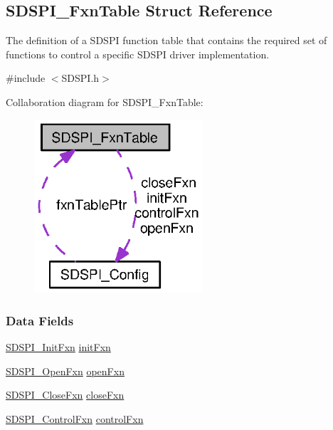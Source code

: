 \subsection{S\-D\-S\-P\-I\-\_\-\-Fxn\-Table Struct Reference}
\label{struct_s_d_s_p_i___fxn_table}


The definition of a S\-D\-S\-P\-I function table that contains the required set of functions to control a specific S\-D\-S\-P\-I driver implementation.  




{\ttfamily \#include $<$S\-D\-S\-P\-I.\-h$>$}



Collaboration diagram for S\-D\-S\-P\-I\-\_\-\-Fxn\-Table\-:
\nopagebreak
\begin{figure}[H]
\begin{center}
\leavevmode
\includegraphics[width=177pt]{struct_s_d_s_p_i___fxn_table__coll__graph}
\end{center}
\end{figure}
\subsubsection*{Data Fields}
\begin{DoxyCompactItemize}
\item 
\hyperlink{_s_d_s_p_i_8h_a3171d9675e245720a8552f667e33ba54}{S\-D\-S\-P\-I\-\_\-\-Init\-Fxn} \hyperlink{struct_s_d_s_p_i___fxn_table_ac593f7347a7b145179fec8e4160816d2}{init\-Fxn}
\item 
\hyperlink{_s_d_s_p_i_8h_a2ff79d0b69515e8da6ad65367239236b}{S\-D\-S\-P\-I\-\_\-\-Open\-Fxn} \hyperlink{struct_s_d_s_p_i___fxn_table_a822c1861740700d5cc489d063552e9e3}{open\-Fxn}
\item 
\hyperlink{_s_d_s_p_i_8h_a81531f5ec9d2e1b167e3c21edc1636cb}{S\-D\-S\-P\-I\-\_\-\-Close\-Fxn} \hyperlink{struct_s_d_s_p_i___fxn_table_a13d86b2434f6e60f14a3926f97101c2c}{close\-Fxn}
\item 
\hyperlink{_s_d_s_p_i_8h_ad4f4fea0465def77622c20abb3519c6c}{S\-D\-S\-P\-I\-\_\-\-Control\-Fxn} \hyperlink{struct_s_d_s_p_i___fxn_table_a613920b0aee49813c55c892c73d0aec0}{control\-Fxn}
\end{DoxyCompactItemize}



